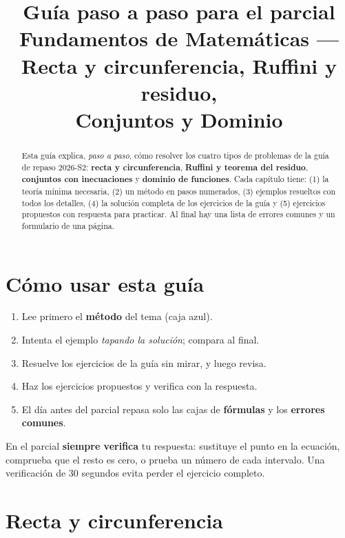 \documentclass[11pt,a4paper]{article}
\title{\textbf{Guía paso a paso para el parcial}\\[0.4em]
\large Fundamentos de Matemáticas --- Recta y circunferencia, Ruffini y residuo,\\
Conjuntos y Dominio}
\author{}
\date{}
\theoremstyle{ej}
\begin{document}
\maketitle
\thispagestyle{fancy}

\begin{abstract}
Esta guía explica, \emph{paso a paso}, cómo resolver los cuatro tipos de problemas de la
guía de repaso 2026-S2: \textbf{recta y circunferencia}, \textbf{Ruffini y teorema del residuo},
\textbf{conjuntos con inecuaciones} y \textbf{dominio de funciones}. Cada capítulo tiene:
(1) la teoría mínima necesaria, (2) un método en pasos numerados, (3) ejemplos resueltos
con todos los detalles, (4) la solución completa de los ejercicios de la guía y (5) ejercicios
propuestos con respuesta para practicar. Al final hay una lista de errores comunes y un
formulario de una página.
\end{abstract}

\tableofcontents
\newpage

\section{Cómo usar esta guía}
\begin{enumerate}
  \item Lee primero el \textbf{método} del tema (caja azul).
  \item Intenta el ejemplo \emph{tapando la solución}; compara al final.
  \item Resuelve los ejercicios de la guía sin mirar, y luego revisa.
  \item Haz los ejercicios propuestos y verifica con la respuesta.
  \item El día antes del parcial repasa solo las cajas de \textbf{fórmulas} y los \textbf{errores comunes}.
\end{enumerate}

\begin{cuidado}
En el parcial \textbf{siempre verifica} tu respuesta: sustituye el punto en la ecuación,
comprueba que el resto es cero, o prueba un número de cada intervalo. Una verificación de
30 segundos evita perder el ejercicio completo.
\end{cuidado}

\section{Recta y circunferencia}
\end{document}
